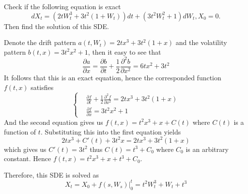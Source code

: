     \problem
    \begin{question}
        Check if the following equation is exact
        \[dX_t=(2tW_t^3+3t^2(1+W_t))dt+(3t^2W_t^2+1)dW_t, X_0=0.\]
        Then find the solution of this SDE.
    \end{question}
    Denote the drift pattern $a(t,W_t)=2tx^3+3t^2(1+x)$
    and the volatility pattern $b(t,x)=3t^2x^2+1$, then
    it easy to see that
    \[\frac{\partial a}{\partial x}
    =\frac{\partial b}{\partial t}+
    \frac{1}{2}\frac{\partial^2 b}{\partial x^2}
    =6tx^2+3t^2\]
    It follows that this is an exact equation, hence the
    corresponded function $f(t,x)$ satisfies
    \[\left\{\begin{aligned}
        &\frac{\partial f}{\partial t}+\frac{1}{2}\frac{\partial^2 f}{\partial x^2}
        =2tx^3+3t^2(1+x)\\
        &\frac{\partial f}{\partial x}=3t^2x^2+1
    \end{aligned}\right.\]
    And the second equation gives us $f(t,x)=t^2x^3+x+C(t)$ where $C(t)$ is
    a function of $t$. Substituting this into the first equation yields
    \[2tx^3+C'(t)+3t^2x=2tx^3+3t^2(1+x)\]
    which gives us $C'(t)=3t^2$ thus $C(t)=t^3+C_0$ where $C_0$ is an arbitrary constant.
    Hence $f(t,x)=t^2x^3+x+t^3+C_0$.

    Therefore, this SDE is solved as
    \[X_t=X_0+f(s,W_s)|_0^t=t^2W_t^3+W_t+t^3\]

